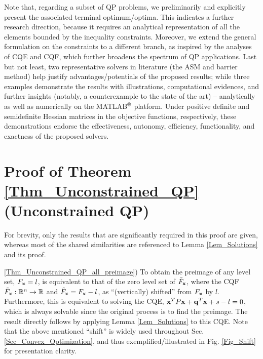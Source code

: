 \documentclass{imaman}
\newcommand{\bfx}{{\bf x}}
\newcommand{\bfq}{{\bf q}}
\newcommand{\real}{\mathbb{R}}
\newcommand{\itn}{{\it n}}
\numberwithin{equation}{section}
\begin{document}
Note that, regarding a subset of QP problems, we preliminarily and explicitly present the associated terminal optimum/optima. This indicates a further research direction, because it requires an analytical representation of all the elements bounded by the inequality constraints. Moreover, we extend the general formulation on the constraints to a different branch, as inspired by the analyses of CQE and CQF, which further broadens the spectrum of QP applications. Last but not least, two representative solvers in literature (the ASM and barrier method) help justify advantages/potentials of the proposed results; while three examples demonstrate the results with illustrations, computational evidences, and further insights (notably, a counterexample to the state of the art) -- analytically as well as numerically on the MATLAB$\textsuperscript{\textregistered}$ platform. Under positive definite and semidefinite Hessian matrices in the objective functions, respectively, these demonstrations endorse the effectiveness, autonomy, efficiency, functionality, and exactness of the proposed solvers.

\appendix

\section{Proof of Theorem \ref{Thm_Unconstrained_QP} (Unconstrained QP)}
\label{App_Proof_Unconstrained_QP}

For brevity, only the results that are significantly required in this proof are given, whereas most of the shared similarities are referenced to Lemma \ref{Lem_Solutions} and its proof.

\noindent\ref{Thm_Unconstrained_QP_all_preimage}) To obtain the preimage of any level set, $F_\bfx=l$, is equivalent to that of the zero level set of $\tilde F_\bfx$, where the CQF $\tilde F_\bfx:\real^\itn\rightarrow\real$ and $\tilde F_\bfx=F_\bfx-l$, as ``(vertically) shifted'' from $F_\bfx$ by $l$. Furthermore, this is equivalent to solving the CQE, $\bfx^TP\bfx+\bfq^T\bfx+s-l=0$, which is always solvable since the original process is to find the preimage. The result directly follows by applying Lemma \ref{Lem_Solutions} to this CQE. Note that the above mentioned ``shift'' is widely used throughout Sec. \ref{Sec_Convex_Optimization}, and thus exemplified/illustrated in Fig. \ref{Fig_Shift} for presentation clarity.\vspace{0.16cm}
\end{document}

